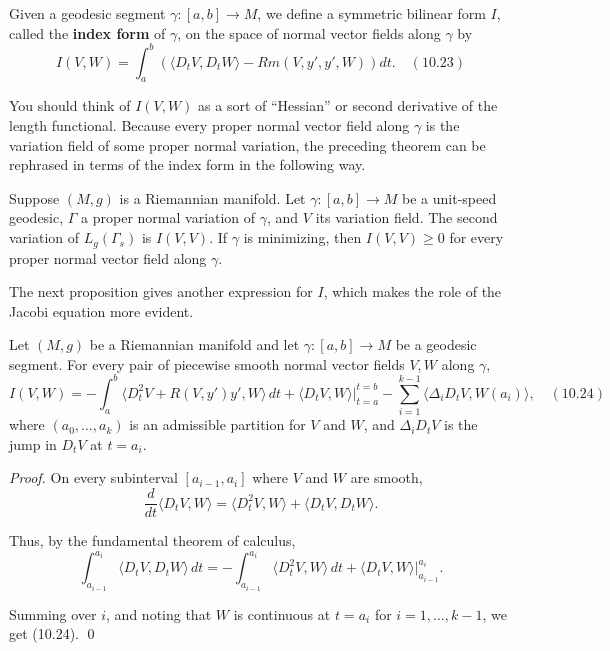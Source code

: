 Given a geodesic segment $\gamma: [a, b] \to M$, we define a symmetric bilinear form
$I$, called the \textbf{index form} of $\gamma$, on the space of normal vector fields along $\gamma$ by
\[
I(V, W) = \int_a^b \left( \langle D_t V, D_t W \rangle - Rm(V, y', y', W) \right) dt. \quad (10.23)
\]

You should think of $I(V, W)$ as a sort of ``Hessian'' or second derivative of the length functional. Because every proper normal vector field along $\gamma$ is the variation field of some proper normal variation, the preceding theorem can be rephrased in terms of the index form in the following way.

\begin{corollary}\label{cor:second-variation-minimizing-geodesic}
Suppose $(M, g)$ is a Riemannian manifold. Let $\gamma: [a,b] \to M$ be a unit-speed geodesic, $\Gamma$ a proper normal variation of $\gamma$, and $V$ its variation field. The second variation of $L_g(\Gamma_s)$ is $I(V,V)$. If $\gamma$ is minimizing, then $I(V,V) \geq 0$ for every proper normal vector field along $\gamma$.
\end{corollary}

The next proposition gives another expression for $I$, which makes the role of the Jacobi equation more evident.

\begin{proposition}\label{prop:index-form-jacobi-equation}
Let $(M, g)$ be a Riemannian manifold and let $\gamma: [a,b] \to M$ be a geodesic segment. For every pair of piecewise smooth normal vector fields $V, W$ along $\gamma$,
\[
I(V, W) = -\int_a^b \langle D_t^2 V + R(V, y')y', W \rangle \, dt
+ \langle D_t V, W \rangle \bigg|_{t=a}^{t=b} - \sum_{i=1}^{k-1} \langle \Delta_i D_t V, W(a_i) \rangle, \quad (10.24)
\]
where $(a_0, \ldots, a_k)$ is an admissible partition for $V$ and $W$, and $\Delta_i D_t V$ is the jump in $D_t V$ at $t = a_i$.

\textit{Proof.} On every subinterval $[a_{i-1}, a_i]$ where $V$ and $W$ are smooth,
\[
\frac{d}{dt} \langle D_t V, W \rangle = \langle D_t^2 V, W \rangle + \langle D_t V, D_t W \rangle.
\]

Thus, by the fundamental theorem of calculus,
\[
\int_{a_{i-1}}^{a_i} \langle D_t V, D_t W \rangle \, dt = -\int_{a_{i-1}}^{a_i} \langle D_t^2 V, W \rangle \, dt + \langle D_t V, W \rangle \bigg|_{a_{i-1}}^{a_i}.
\]

Summing over $i$, and noting that $W$ is continuous at $t = a_i$ for $i = 1, \ldots, k-1$, we get (10.24). \qed
\end{proposition}

